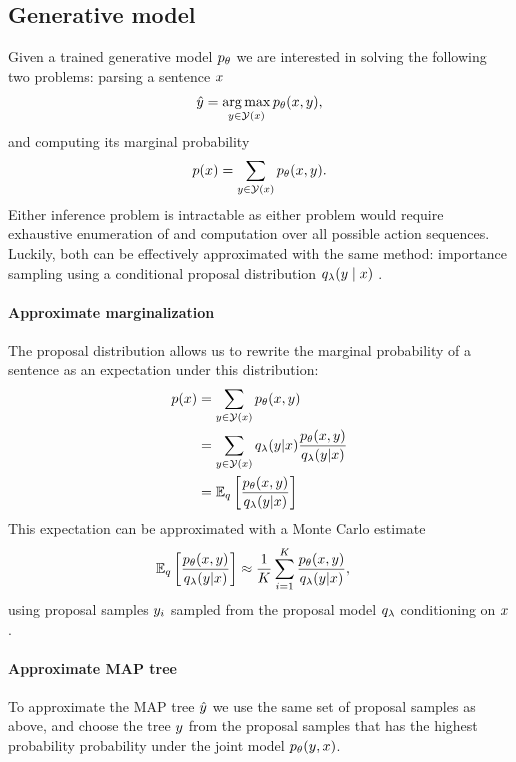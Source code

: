 \subsection{Generative model}
Given a trained generative model $p_{\theta}$ we are interested in solving the following two problems: parsing a sentence $x$
\begin{align*}
  \hat{y} = \operatorname*{arg\,max}_{ y \in \mathcal{Y}(x) } p_{\theta}(x, y),
\end{align*}
and computing its marginal probability
\begin{align*}
  p(x) = \sum_{ y \in \mathcal{Y}(x) } p_{\theta}(x, y).
\end{align*}
Either inference problem is intractable as either problem would require exhaustive enumeration of and computation over all possible action sequences.  Luckily, both can be effectively approximated with the same method: importance sampling using a conditional proposal distribution $q_{\lambda}(y \mid x)$ \citep{dyer2016rnng}.

\paragraph{Approximate marginalization}
The proposal distribution allows us to rewrite the marginal probability of a sentence as an expectation under this distribution:
\begin{align*}
  p (x)
    &= \sum_{y  \in \mathcal{Y}(x)} p_{\theta}(x, y) \\
    &= \sum_{y  \in \mathcal{Y}(x)} q_{\lambda}(y |x) \frac{p_{\theta}(x,y )}{q_{\lambda}(y | x)} \\
    &= \operatorname{\mathbb{E}}_{q} \bigg[\frac{p_{\theta}(x,y )}{q_{\lambda}(y | x)} \bigg] \\
  \label{eq:lowerbound}
\end{align*}
This expectation can be approximated with a Monte Carlo estimate
\begin{align}
  \operatorname{\mathbb{E}}_{q} \bigg[\frac{p_{\theta}(x,y )}{q_{\lambda}(y | x)} \bigg]
    &\approx \frac{1}{K}\sum_{i=1}^K  \frac{p_{\theta}(x,y )}{q_{\lambda}(y | x)},
\end{align}
using proposal samples $y_i$ sampled from the proposal model $q_{\lambda}$ conditioning on $x$.

\paragraph{Approximate MAP tree}
To approximate the MAP tree $\hat{y}$ we use the same set of proposal samples as above, and choose the tree $y$ from the proposal samples that has the highest probability probability under the joint model $p_{\theta}( y, x)$.

